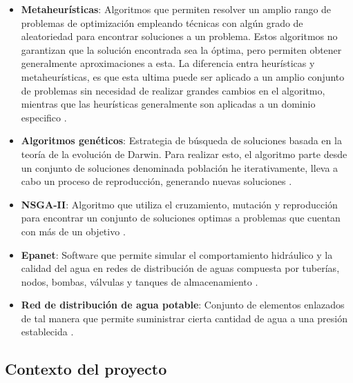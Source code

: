 \documentclass[11pt,letterpaper]{article}
\begin{document}
\begin{itemize}
\item \textbf{Metaheurísticas}: Algoritmos que permiten resolver un amplio rango de problemas de optimización empleando técnicas con algún grado de aleatoriedad para encontrar soluciones a un problema. Estos algoritmos no garantizan que la solución encontrada sea la óptima, pero permiten obtener generalmente aproximaciones a esta. La diferencia entra heurísticas y metaheurísticas, es que esta ultima puede ser aplicado a un amplio conjunto de problemas sin necesidad de realizar grandes cambios en el algoritmo, mientras que las heurísticas generalmente son aplicadas a un dominio especifico \cite{Yang2015,Boussaid2013,Luke2013}.

\item \textbf{Algoritmos genéticos}: Estrategia de búsqueda de soluciones basada en la teoría de la evolución de Darwin. Para realizar esto, el algoritmo  parte desde un conjunto de soluciones denominada población he iterativamente, lleva a cabo un proceso de reproducción, generando nuevas soluciones \cite{Heiss-Czedik1997}.

\item \textbf{NSGA-II}: Algoritmo que utiliza el cruzamiento, mutación y reproducción para encontrar un conjunto de soluciones optimas a problemas que cuentan con más de un objetivo \cite{Deb2002}. 

\item \textbf{Epanet}: Software que permite simular el comportamiento hidráulico y la calidad del agua en redes de distribución de aguas compuesta por tuberías, nodos, bombas, válvulas y tanques de almacenamiento \cite{Rossman2017}. 
\item \textbf{Red de distribución de agua potable}: Conjunto de elementos enlazados de tal manera que permite suministrar cierta cantidad de agua a una presión establecida \cite{Doctoral2012}.
 
\end{itemize}

\subsection{Contexto del proyecto} 
\end{document}
